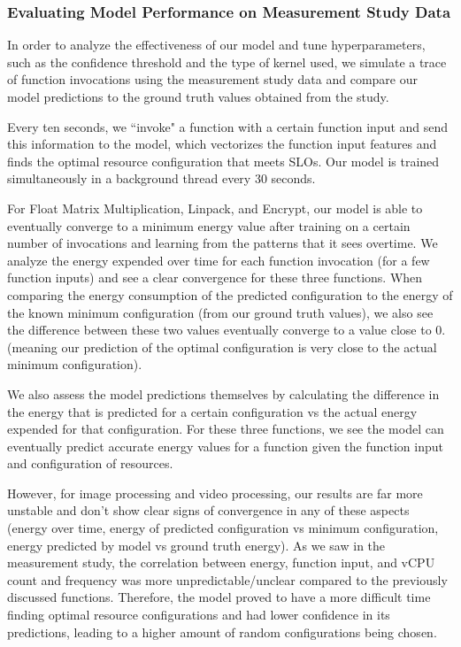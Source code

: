 \documentclass[times, 10pt,twocolumn]{article}
\begin{document}
 \subsubsection{Evaluating Model Performance on Measurement Study Data}
In order to analyze the effectiveness of our model and tune hyperparameters, such as the confidence threshold and the type of kernel used, we simulate a trace of function invocations using the measurement study data and compare our model predictions to the ground truth values obtained from the study.

Every ten seconds, we ``invoke" a function with a certain function input and send this information to the model, which vectorizes the function input features and finds the optimal resource configuration that meets SLOs. Our model is trained simultaneously in a background thread every 30 seconds. 
 
For Float Matrix Multiplication, Linpack, and Encrypt, our model is able to eventually converge to a minimum energy value after training on a certain number of invocations and learning from the patterns that it sees overtime. We analyze the energy expended over time for each function invocation (for a few function inputs) and see a clear convergence for these three functions. When comparing the energy consumption of the predicted configuration to the energy of the known minimum configuration (from our ground truth values), we also see the difference between these two values eventually converge to a value close to 0. (meaning our prediction of the optimal configuration is very close to the actual minimum configuration).  

We also assess the model predictions themselves by calculating the difference in the energy that is predicted for a certain configuration vs the actual energy expended for that configuration. For these three functions, we see the model can eventually predict accurate energy values for a function given the function input and configuration of resources.

However, for image processing and video processing, our results are far more unstable and don't show clear signs of convergence in any of these aspects (energy over time, energy of predicted configuration vs minimum configuration, energy predicted by model vs ground truth energy). As we saw in the measurement study, the correlation between energy, function input, and vCPU count and frequency was more unpredictable/unclear compared to the previously discussed functions. Therefore, the model proved to have a more difficult time finding optimal resource configurations and had lower confidence in its predictions, leading to a higher amount of random configurations being chosen. 
\end{document}

